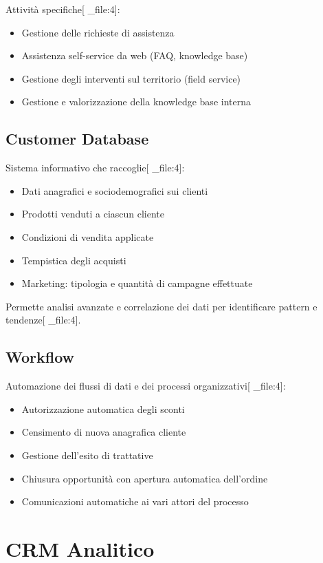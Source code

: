\documentclass[12pt,a4paper]{article}
\begin{document}
Attività specifiche[ _file:4]:
\begin{itemize}
    \item Gestione delle richieste di assistenza
    \item Assistenza self-service da web (FAQ, knowledge base)
    \item Gestione degli interventi sul territorio (field service)
    \item Gestione e valorizzazione della knowledge base interna
\end{itemize}

\subsection{Customer Database}
Sistema informativo che raccoglie[ _file:4]:
\begin{itemize}
    \item Dati anagrafici e sociodemografici sui clienti
    \item Prodotti venduti a ciascun cliente
    \item Condizioni di vendita applicate
    \item Tempistica degli acquisti
    \item Marketing: tipologia e quantità di campagne effettuate
\end{itemize}

Permette analisi avanzate e correlazione dei dati per identificare pattern e tendenze[ _file:4].

\subsection{Workflow}
Automazione dei flussi di dati e dei processi organizzativi[ _file:4]:
\begin{itemize}
    \item Autorizzazione automatica degli sconti
    \item Censimento di nuova anagrafica cliente
    \item Gestione dell'esito di trattative
    \item Chiusura opportunità con apertura automatica dell'ordine
    \item Comunicazioni automatiche ai vari attori del processo
\end{itemize}

\section{CRM Analitico}
\end{document}
